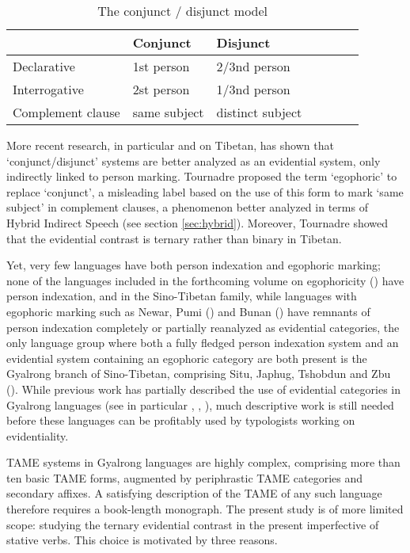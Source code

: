 \documentclass[oldfontcommands,oneside,a4paper,11pt]{article}
\begin{document}
\begin{table}[H]
\caption{The conjunct / disjunct model} \label{tab:conjunct} \centering
\begin{tabular}{lllllll}
\toprule
& Conjunct & Disjunct \\
\midrule
Declarative & 1st person & 2/3nd person \\
Interrogative & 2st person & 1/3nd person \\
Complement clause & same subject & distinct subject \\
\bottomrule
\end{tabular}
\end{table}

More recent research, in particular \citet{sun93evidentiality} and \citet{tournadre08conjunct} on Tibetan, has shown that `conjunct/disjunct' systems are better analyzed as an evidential system, only indirectly linked to person marking. Tournadre proposed the term `egophoric' to replace `conjunct', a misleading label based on the use of this form to mark `same subject' in complement clauses, a phenomenon better analyzed in terms of Hybrid Indirect Speech (see section \ref{sec:hybrid}). Moreover, Tournadre showed that the evidential contrast is ternary rather than binary in Tibetan.

Yet, very few languages have both person indexation and egophoric marking; none of the languages included in the forthcoming volume on egophoricity (\citealt{norcliffe17egophoricity}) have person indexation, and in the Sino-Tibetan family, while languages with egophoric marking such as Newar, Pumi (\citealt{daudey14volition}) and Bunan (\citealt{widmer17epistemization}) have remnants of person indexation completely or partially reanalyzed as evidential categories, the only language group where both a fully fledged person indexation system and an evidential system containing an egophoric category are both present is the Gyalrong branch of Sino-Tibetan, comprising Situ, Japhug, Tshobdun and Zbu (\citealt{sun18evidentials}). While previous work has partially described the use of evidential categories in Gyalrong languages (see in particular \citealt{youjing03zhuokeji}, \citealt{jackson03caodeng}, \citealt[617-620]{jacques17sketch}), much descriptive work is still needed before these languages can be profitably used by typologists working on evidentiality.

TAME systems in Gyalrong languages are highly complex, comprising more than ten basic TAME forms, augmented by periphrastic TAME categories and secondary affixes. A satisfying description of the TAME of any such language therefore requires a book-length monograph. The present study is of more limited scope: studying the ternary evidential contrast in the present imperfective of stative verbs. This choice is motivated by three reasons.
\end{document}
